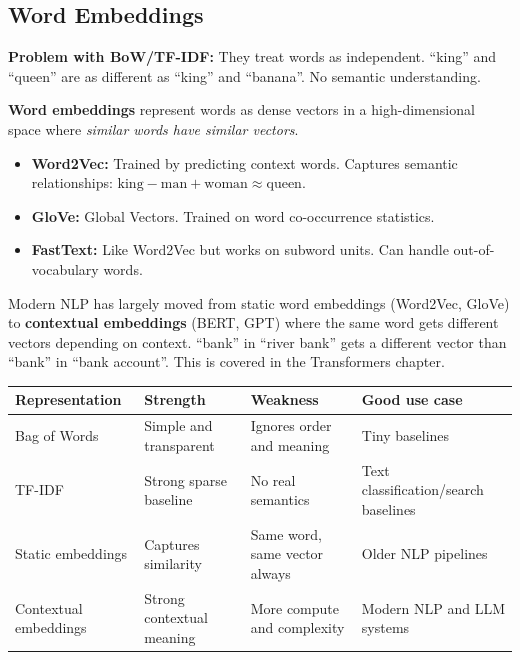 \documentclass[12pt, a4paper, oneside]{book}
\begin{document}
\subsection{Word Embeddings}

\textbf{Problem with BoW/TF-IDF:} They treat words as independent. ``king'' and ``queen'' are as different as ``king'' and ``banana''. No semantic understanding.

\textbf{Word embeddings} represent words as dense vectors in a high-dimensional space where \emph{similar words have similar vectors}.

\begin{itemize}[leftmargin=2em]
    \item \textbf{Word2Vec:} Trained by predicting context words. Captures semantic relationships: $\text{king} - \text{man} + \text{woman} \approx \text{queen}$.
    \item \textbf{GloVe:} Global Vectors. Trained on word co-occurrence statistics.
    \item \textbf{FastText:} Like Word2Vec but works on subword units. Can handle out-of-vocabulary words.
\end{itemize}

\begin{notebox}
Modern NLP has largely moved from static word embeddings (Word2Vec, GloVe) to \textbf{contextual embeddings} (BERT, GPT) where the same word gets different vectors depending on context. ``bank'' in ``river bank'' gets a different vector than ``bank'' in ``bank account''. This is covered in the Transformers chapter.
\end{notebox}

\begin{center}
\begin{tabular}{l l l l}
\toprule
\textbf{Representation} & \textbf{Strength} & \textbf{Weakness} & \textbf{Good use case} \\
\midrule
Bag of Words & Simple and transparent & Ignores order and meaning & Tiny baselines \\
TF-IDF & Strong sparse baseline & No real semantics & Text classification/search baselines \\
Static embeddings & Captures similarity & Same word, same vector always & Older NLP pipelines \\
Contextual embeddings & Strong contextual meaning & More compute and complexity & Modern NLP and LLM systems \\
\bottomrule
\end{tabular}
\end{center}
\end{document}
